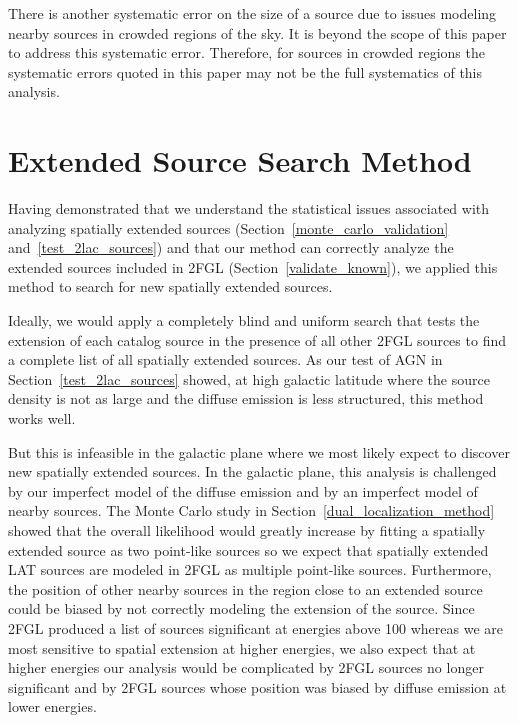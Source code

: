 \documentclass[12pt,preprint]{aastex}
\newcommand{\mev}{\text{MeV}\xspace}
\newcommand{\gev}{\text{GeV}\xspace}
\begin{document}
There is another systematic error on the size of a source due to issues
modeling nearby sources in crowded regions of the sky. It is beyond the
scope of this paper to address this systematic error. Therefore, 
for sources in crowded regions the systematic
errors quoted in this paper may not be the full systematics of this
analysis.

\section{Extended Source Search Method}
\label{extended_source_search_method}


Having demonstrated that we understand the statistical
issues associated with analyzing spatially extended sources
(Section~\ref{monte_carlo_validation} and~\ref{test_2lac_sources}) and
that our method can correctly analyze the extended sources included in
2FGL (Section~\ref{validate_known}), we applied this method to search for
new spatially extended \gev sources.

Ideally, we would apply a completely blind and uniform search that
tests the extension of each catalog source in the presence of all other
2FGL sources to find a complete list of all spatially extended sources.
As our test of AGN in Section~\ref{test_2lac_sources} showed, at high
galactic latitude where the source density is not as large and the
diffuse emission is less structured, this method works well.

But this is infeasible in the galactic plane where we most likely expect
to discover new spatially extended sources.  In the galactic plane,
this analysis is challenged by our imperfect model of the diffuse
emission and by an imperfect model of nearby sources.  The Monte Carlo
study in Section~\ref{dual_localization_method}
showed that the overall likelihood would greatly increase by fitting
a spatially extended source as two point-like sources so we expect
that spatially extended LAT sources are modeled in 2FGL as
multiple point-like sources. Furthermore, the position of other nearby sources
in the region close to an extended source could be biased by not correctly
modeling the extension of the source.  Since 2FGL produced a
list of sources significant at energies above 100 \mev whereas we are
most sensitive to spatial extension at higher energies,
we also expect that at higher energies our analysis would be complicated
by 2FGL sources no longer significant and by 2FGL
sources whose position was biased by diffuse emission at lower energies.
\end{document}
